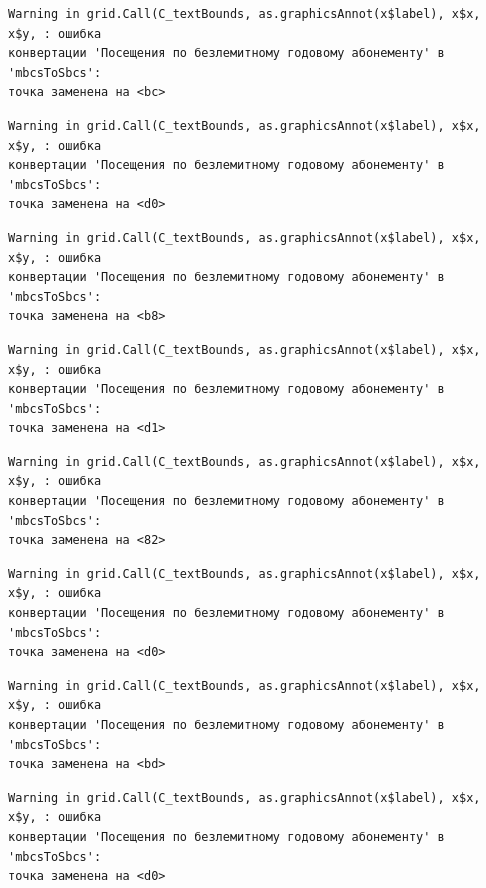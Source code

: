 \documentclass[
  letterpaper,
  DIV=11,
  numbers=noendperiod]{scrreprt}
\begin{document}
\begin{verbatim}
Warning in grid.Call(C_textBounds, as.graphicsAnnot(x$label), x$x, x$y, : ошибка
конвертации 'Посещения по безлемитному годовому абонементу' в 'mbcsToSbcs':
точка заменена на <bc>
\end{verbatim}

\begin{verbatim}
Warning in grid.Call(C_textBounds, as.graphicsAnnot(x$label), x$x, x$y, : ошибка
конвертации 'Посещения по безлемитному годовому абонементу' в 'mbcsToSbcs':
точка заменена на <d0>
\end{verbatim}

\begin{verbatim}
Warning in grid.Call(C_textBounds, as.graphicsAnnot(x$label), x$x, x$y, : ошибка
конвертации 'Посещения по безлемитному годовому абонементу' в 'mbcsToSbcs':
точка заменена на <b8>
\end{verbatim}

\begin{verbatim}
Warning in grid.Call(C_textBounds, as.graphicsAnnot(x$label), x$x, x$y, : ошибка
конвертации 'Посещения по безлемитному годовому абонементу' в 'mbcsToSbcs':
точка заменена на <d1>
\end{verbatim}

\begin{verbatim}
Warning in grid.Call(C_textBounds, as.graphicsAnnot(x$label), x$x, x$y, : ошибка
конвертации 'Посещения по безлемитному годовому абонементу' в 'mbcsToSbcs':
точка заменена на <82>
\end{verbatim}

\begin{verbatim}
Warning in grid.Call(C_textBounds, as.graphicsAnnot(x$label), x$x, x$y, : ошибка
конвертации 'Посещения по безлемитному годовому абонементу' в 'mbcsToSbcs':
точка заменена на <d0>
\end{verbatim}

\begin{verbatim}
Warning in grid.Call(C_textBounds, as.graphicsAnnot(x$label), x$x, x$y, : ошибка
конвертации 'Посещения по безлемитному годовому абонементу' в 'mbcsToSbcs':
точка заменена на <bd>
\end{verbatim}

\begin{verbatim}
Warning in grid.Call(C_textBounds, as.graphicsAnnot(x$label), x$x, x$y, : ошибка
конвертации 'Посещения по безлемитному годовому абонементу' в 'mbcsToSbcs':
точка заменена на <d0>
\end{verbatim}
\end{document}
